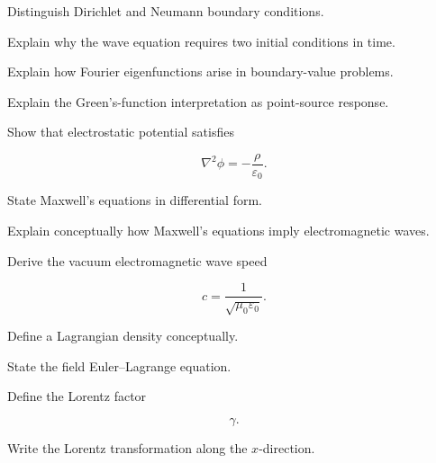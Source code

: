 \begin{exercise}[2]
Distinguish Dirichlet and Neumann boundary conditions.
\end{exercise}

\begin{exercise}[3]
Explain why the wave equation requires two initial conditions in time.
\end{exercise}

\begin{exercise}[3]
Explain how Fourier eigenfunctions arise in boundary-value problems.
\end{exercise}

\begin{exercise}[3]
Explain the Green's-function interpretation as point-source response.
\end{exercise}

\begin{exercise}[2]
Show that electrostatic potential satisfies

\[
\nabla^2\phi
=
-\frac{\rho}{\varepsilon_0}.
\]
\end{exercise}

\begin{exercise}[2]
State Maxwell's equations in differential form.
\end{exercise}

\begin{exercise}[3]
Explain conceptually how Maxwell's equations imply electromagnetic waves.
\end{exercise}

\begin{exercise}[3]
Derive the vacuum electromagnetic wave speed

\[
c
=
\frac{1}{\sqrt{\mu_0\varepsilon_0}}.
\]
\end{exercise}

\begin{exercise}[2]
Define a Lagrangian density conceptually.
\end{exercise}

\begin{exercise}[3]
State the field Euler--Lagrange equation.
\end{exercise}

\begin{exercise}[2]
Define the Lorentz factor

\[
\gamma.
\]
\end{exercise}

\begin{exercise}[2]
Write the Lorentz transformation along the \(x\)-direction.
\end{exercise}

